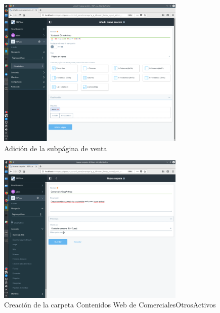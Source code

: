 \begin{figure}[H]
\begin{center}
\includegraphics[width=0.8\textwidth]{./img/liferay/5.png}
\end{center}
\caption{Adición de la subpágina de venta}
\label{img:lr5}
\end{figure}

\begin{figure}[H]
\begin{center}
\includegraphics[width=0.8\textwidth]{./img/liferay/6.png}
\end{center}
\caption{Creación de la carpeta Contenidos Web de ComercialesOtrosActivos}
\label{img:lr6}
\end{figure}

